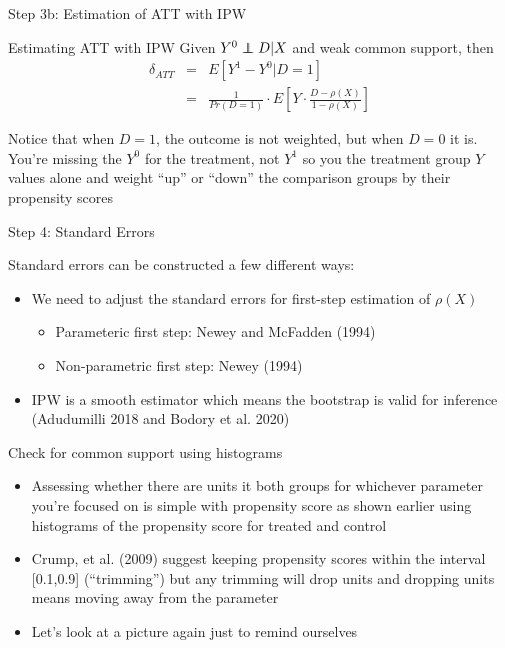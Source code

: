 \documentclass{beamer}
\newcommand\independent{\protect\mathpalette{\protect\independenT}{\perp}}
\def\independenT#1#2{\mathrel{\rlap{$#1#2$}\mkern2mu{#1#2}}}
\begin{document}
	

\begin{frame}{Step 3b: Estimation of ATT with IPW}
	
		\begin{block}{Estimating ATT with IPW}
	Given $Y^0 \independent{D}|X$ and weak common support, then
		\begin{eqnarray*}
		\delta_{ATT}&=&E[Y^1-Y^0|D=1] \\
		&=& \frac{1}{Pr(D=1)} \cdot  E \left[ Y \cdot \frac{D-\rho(X)}{1-\rho(X)} \right]
		\end{eqnarray*}
	\end{block}Notice that when $D=1$, the outcome is not weighted, but when $D=0$ it is. You're missing the $Y^0$ for the treatment, not $Y^1$ so you the treatment group $Y$ values alone and weight ``up'' or ``down'' the comparison groups by their propensity scores

\end{frame}


\begin{frame}{Step 4: Standard Errors}
	
		
Standard errors can be constructed a few different ways:
	\begin{itemize}
	\item We need to adjust the standard errors for first-step estimation of $\rho(X)$
		\begin{itemize}
		\item Parameteric first step: Newey and McFadden (1994)
		\item Non-parametric first step: Newey (1994)
		\end{itemize}
	\item IPW is a smooth estimator which means the bootstrap is valid for inference  (Adudumilli 2018 and Bodory et al. 2020) 
	\end{itemize}
\end{frame}


\begin{frame}{Check for common support using histograms}

\begin{itemize}

\item Assessing whether there are units it both groups for whichever parameter you're focused on is simple with propensity score as shown earlier using histograms of the propensity score for treated and control
\item Crump, et al. (2009) suggest keeping propensity scores within the interval [0.1,0.9] (``trimming'') but any trimming will drop units and dropping units means moving away from the parameter
\item Let's look at a picture again just to remind ourselves

\end{itemize}

\end{frame}
\end{document}
